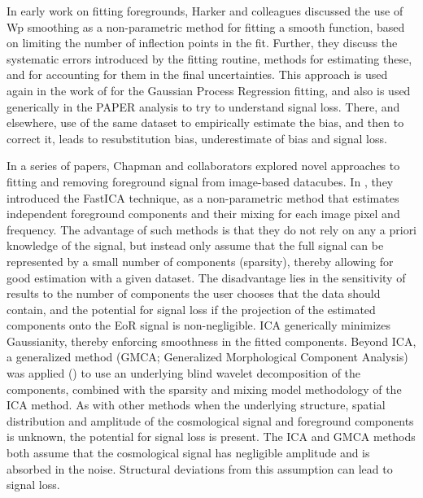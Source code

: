 In early work on fitting foregrounds, Harker and colleagues \cite{2010MNRAS.405.2492H} discussed the use of Wp smoothing as a non-parametric method for fitting a smooth function, based on limiting the number of inflection points in the fit. Further, they discuss the systematic errors introduced by the fitting routine, methods for estimating these, and for accounting for them in the final uncertainties. This approach is used again in the work of \cite{2018MNRAS.478.3640M} for the Gaussian Process Regression fitting, and also is used generically in the PAPER analysis to try to understand signal loss. 
There, and elsewhere, use of the same dataset to empirically estimate the bias, and then to correct it, leads to resubstitution bias, underestimate of bias and signal loss.

In a series of papers, Chapman and collaborators explored novel approaches to fitting and removing foreground signal from image-based datacubes. In \cite{2012MNRAS.423.2518C}, they introduced the FastICA technique, as a non-parametric method that estimates independent foreground components and their mixing for each image pixel and frequency. The advantage of such methods is that they do not rely on any a priori knowledge of the signal, but instead only assume that the full signal can be represented by a small number of components (sparsity), thereby allowing for good estimation with a given dataset. The disadvantage lies in the sensitivity of results to the number of components the user chooses that the data should contain, and the potential for signal loss if the projection of the estimated components onto the EoR signal is non-negligible. ICA generically minimizes Gaussianity, thereby enforcing smoothness in the fitted components. Beyond ICA, a generalized method (GMCA; Generalized Morphological Component Analysis) was applied (\cite{2013MNRAS.429..165C,chapman14}) to use an underlying blind wavelet decomposition of the components, combined with the sparsity and mixing model methodology of the ICA method. As with other methods when the underlying structure, spatial distribution and amplitude of the cosmological signal and foreground components is unknown, the potential for signal loss is present. The ICA and GMCA methods both assume that the cosmological signal has negligible amplitude and is absorbed in the noise. Structural deviations from this assumption can lead to signal loss.

